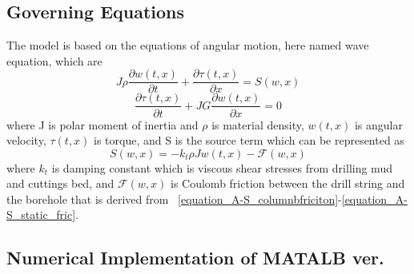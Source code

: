 \subsection{Governing Equations}
The model is based on the equations of angular motion, here named wave equation, which are
\begin{equation}\label{AS-motion}
  J\rho\frac{\partial w(t,x)}{\partial t} + \frac{\partial \tau (t,x)}{\partial x} = S(w,x) 
\end{equation}
\begin{equation}\label{AS-motion1}
 \frac{\partial\tau(t,x)}{\partial t} + JG\frac{\partial w(t,x)}{\partial x} = 0 
\end{equation}
where J is polar moment of inertia and $\rho$ is material density, $w(t,x)$ is angular velocity, $\tau(t,x)$ is torque, and S is the source term which can be represented as
\begin{equation}\label{AS-sourceterm}
  S(w,x) = -k_t \rho J w(t,x) - \mathcal{F}(w,x)
\end{equation}
where $k_t$ is damping constant which is viscous shear stresses from drilling mud and cuttings bed, and $\mathcal{F}(w,x)$ is Coulomb friction between the drill string and the borehole that is derived from \equationname~\ref{equation_A-S_columnbfriciton}-\ref{equation_A-S_static_fric}.

\subsection{Numerical Implementation of MATALB ver.}
